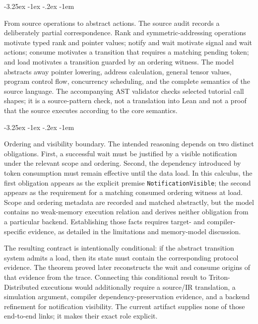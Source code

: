 \documentclass[a4paper,USenglish]{lipics-v2021}
\makeatletter
\renewcommand\paragraph{\@startsection{paragraph}{4}{\z@}%
  {-3.25ex \@plus -1ex \@minus -.2ex}%
  {-1em}%
  {\sffamily\large\bfseries\raggedright}}
\makeatother
\begin{document}
\paragraph{From source operations to abstract actions.} The source audit records a deliberately partial correspondence. Rank and symmetric-addressing operations motivate typed rank and pointer values; notify and wait motivate signal and wait actions; consume motivates a transition that requires a matching pending token; and load motivates a transition guarded by an ordering witness. The model abstracts away pointer lowering, address calculation, general tensor values, program control flow, concurrency scheduling, and the complete semantics of the source language. The accompanying AST validator checks selected tutorial call shapes; it is a source-pattern check, not a translation into Lean and not a proof that the source executes according to the core semantics.

\paragraph{Ordering and visibility boundary.} The intended reasoning depends on two distinct obligations. First, a successful wait must be justified by a visible notification under the relevant scope and ordering. Second, the dependency introduced by token consumption must remain effective until the data load. In this calculus, the first obligation appears as the explicit premise \texttt{NotificationVisible}; the second appears as the requirement for a matching consumed ordering witness at load. Scope and ordering metadata are recorded and matched abstractly, but the model contains no weak-memory execution relation and derives neither obligation from a particular backend. Establishing those facts requires target- and compiler-specific evidence, as detailed in the limitations and memory-model discussion.

The resulting contract is intentionally conditional: if the abstract transition system admits a load, then its state must contain the corresponding protocol evidence. The theorem proved later reconstructs the wait and consume origins of that evidence from the trace. Connecting this conditional result to Triton-Distributed executions would additionally require a source/IR translation, a simulation argument, compiler dependency-preservation evidence, and a backend refinement for notification visibility. The current artifact supplies none of those end-to-end links; it makes their exact role explicit.
\end{document}
